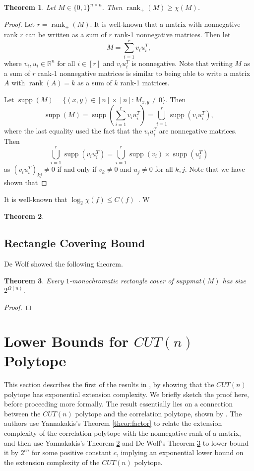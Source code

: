 \documentclass{article}
\newtheorem{theorem}{\sc Theorem}
\theoremstyle{definition}
\theoremstyle{remark}
\newcommand{\nrank}{\operatorname{rank}_+}
\newcommand{\rank}{\operatorname{rank}}
\newcommand{\bits}{\{0,1\}}
\newcommand{\supp}{\operatorname{supp}}
\renewcommand{\R}{\mathbb{R}}
\begin{document}
\begin{theorem}
Let $M \in \bits^{n \times n}$. Then $\rank_+(M) \ge \chi(M)$.
\end{theorem}
\begin{proof}
Let $r = \nrank(M)$. It is well-known that a matrix with nonnegative rank $r$ can be written as a sum of $r$ rank-1 nonnegative matrices. Then let
\[
M = \sum_{i=1}^r v_iu_i^T,
\]
where $v_i, u_i \in \R^n$ for all $i \in [r]$ and $v_iu_i^T$ is nonnegative.
Note that writing $M$ as a sum of $r$ rank-1 nonnegative matrices is similar to being able to write a matrix $A$ with $\rank(A) = k$ as a sum of $k$ rank-1 matrices.

Let $\supp(M) = \{(x,y) \in [n] \times [n] : M_{x,y} \ne 0\}$. Then
\[
\supp(M) = \supp\left(\sum_{i=1}^r v_iu_i^T\right) = \bigcup_{i=1}^r \supp(v_iu_i^T), 
\]
where the last equality used the fact that the $v_iu_i^T$ are nonnegative matrices. Then 
\[
\bigcup_{i=1}^r \supp(v_iu_i^T) = \bigcup_{i=1}^r \supp(v_i) \times \supp(u_i^T) 
\]
as $(v_iu_i^T)_{kj} \ne 0$ if and only if $v_k \ne 0$ and $u_j \ne 0$ for all $k,j$. Note that we have shown that 
\end{proof}

It is well-known that $\log_2 \chi(f) \le C(f)$~\cite{arora-borak}. W


\begin{theorem}\label{theor:suppmat}
\end{theorem}

\subsection{Rectangle Covering Bound}\label{sec:rec-cover}


De Wolf \cite{de-wolf} showed the following theorem.
\begin{theorem}\label{theor:dewolf}
Every $1$-monochromatic rectangle cover of suppmat$(M)$ has size $2^{\Omega(n)}$.
\end{theorem}
\begin{proof}
\end{proof}

\section{Lower Bounds for $CUT(n)$ Polytope}

This section describes the first of the results in \cite{fiorini}, by showing that the $CUT(n)$ polytope has exponential extension complexity. We briefly sketch the proof here, before proceeding more formally. The result essentially lies on a connection between the $CUT(n)$ polytope and the correlation polytope, shown by \cite{de-simone}. The authors use Yannakakis's Theorem \ref{theor:factor} to relate the extension complexity of the correlation polytope with the nonnegative rank of a matrix, and then use Yannakakis's Theorem \ref{theor:suppmat} and De Wolf's Theorem \ref{theor:dewolf} to lower bound it by $2^{cn}$ for some positive constant $c$, implying an exponential lower bound on the extension complexity of the $CUT(n)$ polytope.
\end{document}

